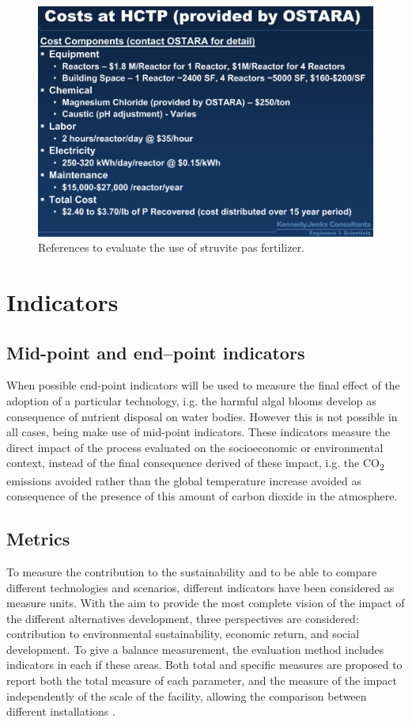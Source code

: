 \documentclass[10pt,a4paper]{article}
\begin{document}
\begin{figure}[H]
	\centering
	\includegraphics[width=0.6\linewidth]{ostara_costs} 
	\caption{References to evaluate the use of struvite pas fertilizer.}
	\label{fig:struvite_refs}
\end{figure}


\section{Indicators}
\subsection{Mid-point and end--point indicators}
When possible end-point indicators will be used to measure the final effect of the adoption of a particular technology, i.g. the harmful algal blooms develop as consequence of nutrient disposal on water bodies. However this is not possible in all cases, being make use of mid-point indicators. These indicators measure the direct impact of the process evaluated on the socioeconomic or environmental context, instead of the final consequence derived of these impact, i.g. the CO\textsubscript{2} emissions avoided rather than the global temperature increase avoided as consequence of the presence of this amount of carbon dioxide in the atmosphere.

\subsection{Metrics}
To measure the contribution to the sustainability and to be able to compare different technologies and scenarios, different indicators have been considered as measure units. With the aim to provide the most complete vision of the impact of the different alternatives development, three perspectives are considered: contribution to environmental sustainability, economic return, and social development. To give a balance measurement, the evaluation method includes indicators in each if these areas. Both total and specific measures are proposed to report both the total measure of each parameter, and the measure of the impact independently of the scale of the facility, allowing the comparison between different installations \cite{IChemE_sust_metrics}.
\end{document}
